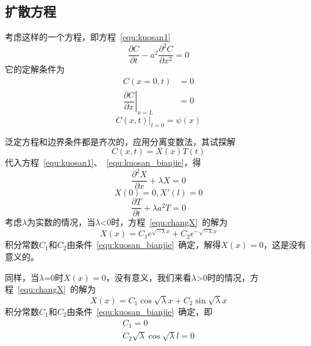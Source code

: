 \documentclass[a4paper,cs4size,adobefonts,fancyhdr]{ctexart}[2005/11/25]
\numberwithin{equation}{section} %
\begin{document}
\subsection{扩散方程}
考虑这样的一个方程，即方程~\ref{equ:kuosan1}
\begin{equation}\label{equ:kuosan1}
	\dfrac{\partial C}{\partial t}-a^2\dfrac{\partial^2 C}{\partial x^2}=0
\end{equation}
它的定解条件为
\begin{equation}
\begin{aligned}\label{equ:kuosan_bianjie}
C(x=0,t)&=0\\
\left.\dfrac{\partial C}{\partial x}\right|_{x=L}&=0
\end{aligned}
\end{equation}
\begin{equation}\label{equ:kuosan_chushi}
\left.C(x,t)\right|_{t=0}=\psi(x)
\end{equation}\par
泛定方程和边界条件都是齐次的，应用分离变数法，其试探解
\begin{equation}
	C(x,t)=X(x)T(t)
\end{equation}
代入方程~\ref{equ:kuosan1}、~\ref{equ:kuosan_bianjie}，得
\begin{equation}\label{equ:changX}
	\dfrac{\partial^2 X}{\partial x}+\lambda X=0
\end{equation}
\begin{equation}
	X(0)=0,X'(l)=0
\end{equation}
\begin{equation}
	\dfrac{\partial T}{\partial t}+\lambda a^2 T=0
\end{equation}
考虑$\lambda$为实数的情况，当$\lambda$<0时，方程~\ref{equ:changX}~的解为
\begin{equation}
	X(x)=C_1e^{\sqrt{-\lambda}x}+C_2e^{-\sqrt{-\lambda}x}
\end{equation}
积分常数$C_1$和$C_2$由条件~\ref{equ:kuosan_bianjie}~确定，解得$X(x)=0$，这是没有意义的。\par
同样，当$\lambda$=0时$X(x)=0$，没有意义，我们来看$\lambda$>0时的情况，方程~\ref{equ:changX}~的解为
\begin{equation}
X(x)=C_1\cos \sqrt{\lambda}x+C_2\sin \sqrt{\lambda}x
\end{equation}
积分常数$C_1$和$C_2$由条件~\ref{equ:kuosan_bianjie}~确定，即
\begin{equation}
\begin{gathered}
	C_1 = 0 \\
	C_2\sqrt{\lambda}\cos\sqrt{\lambda}l=0
\end{gathered}
\end{equation}
\end{document}
